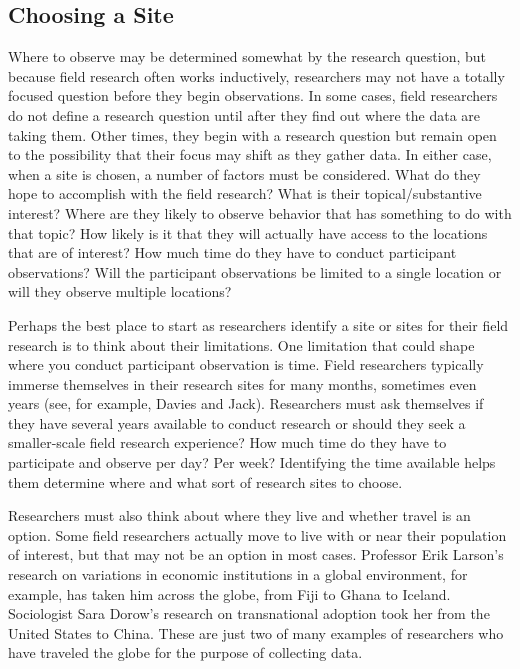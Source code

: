 \subsection{Choosing a Site}

Where to observe may be determined somewhat by the research question, but because field research often works inductively, researchers may not have a totally focused question before they begin observations. In some cases, field researchers do not define a research question until after they find out where the data are taking them. Other times, they begin with a research question but remain open to the possibility that their focus may shift as they gather data. In either case, when a site is chosen, a number of factors must be considered. What do they hope to accomplish with the field research? What is their topical/substantive interest? Where are they likely to observe behavior that has something to do with that topic? How likely is it that they will actually have access to the locations that are of interest? How much time do they have to conduct participant observations? Will the participant observations be limited to a single location or will they observe multiple locations?

Perhaps the best place to start as researchers identify a site or sites for their field research is to think about their limitations. One limitation that could shape where you conduct participant observation is time. Field researchers typically immerse themselves in their research sites for many months, sometimes even years (see, for example, Davies\cite{davies2010corporate} and Jack\cite{jack2010entrepreneurial}). Researchers must ask themselves if they have several years available to conduct research or should they seek a smaller-scale field research experience? How much time do they have to participate and observe per day? Per week? Identifying the time available helps them determine where and what sort of research sites to choose.

Researchers must also think about where they live and whether travel is an option. Some field researchers actually move to live with or near their population of interest, but that may not be an option in most cases. Professor Erik Larson’s research on variations in economic institutions in a global environment, for example, has taken him across the globe, from Fiji to Ghana to Iceland\cite{larson2010time}. Sociologist Sara Dorow's research on transnational adoption took her from the United States to China\cite{dorow2006racialized}. These are just two of many examples of researchers who have traveled the globe for the purpose of collecting data. 

